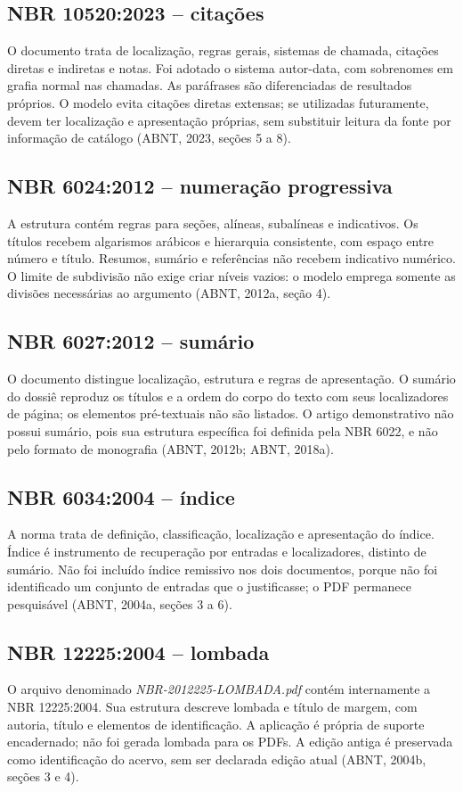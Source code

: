 \subsection{NBR 10520:2023 -- citações}
O documento trata de localização, regras gerais, sistemas de chamada, citações diretas e indiretas e notas. Foi adotado o sistema autor-data, com sobrenomes em grafia normal nas chamadas. As paráfrases são diferenciadas de resultados próprios. O modelo evita citações diretas extensas; se utilizadas futuramente, devem ter localização e apresentação próprias, sem substituir leitura da fonte por informação de catálogo (ABNT, 2023, seções 5 a 8).

\subsection{NBR 6024:2012 -- numeração progressiva}
A estrutura contém regras para seções, alíneas, subalíneas e indicativos. Os títulos recebem algarismos arábicos e hierarquia consistente, com espaço entre número e título. Resumos, sumário e referências não recebem indicativo numérico. O limite de subdivisão não exige criar níveis vazios: o modelo emprega somente as divisões necessárias ao argumento (ABNT, 2012a, seção 4).

\subsection{NBR 6027:2012 -- sumário}
O documento distingue localização, estrutura e regras de apresentação. O sumário do dossiê reproduz os títulos e a ordem do corpo do texto com seus localizadores de página; os elementos pré-textuais não são listados. O artigo demonstrativo não possui sumário, pois sua estrutura específica foi definida pela NBR 6022, e não pelo formato de monografia (ABNT, 2012b; ABNT, 2018a).

\subsection{NBR 6034:2004 -- índice}
A norma trata de definição, classificação, localização e apresentação do índice. Índice é instrumento de recuperação por entradas e localizadores, distinto de sumário. Não foi incluído índice remissivo nos dois documentos, porque não foi identificado um conjunto de entradas que o justificasse; o PDF permanece pesquisável (ABNT, 2004a, seções 3 a 6).

\subsection{NBR 12225:2004 -- lombada}
O arquivo denominado \emph{NBR-2012225-LOMBADA.pdf} contém internamente a NBR 12225:2004. Sua estrutura descreve lombada e título de margem, com autoria, título e elementos de identificação. A aplicação é própria de suporte encadernado; não foi gerada lombada para os PDFs. A edição antiga é preservada como identificação do acervo, sem ser declarada edição atual (ABNT, 2004b, seções 3 e 4).

